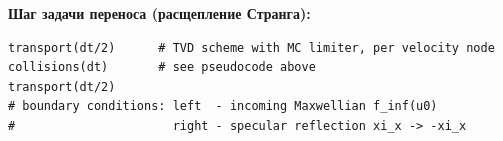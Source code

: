 \documentclass[14pt,a4paper]{extreport}
\numberwithin{equation}{chapter}
\numberwithin{figure}{chapter}
\numberwithin{table}{chapter}
\begin{document}
\medskip
\noindent\textbf{Шаг задачи переноса (расщепление Странга):}
{\footnotesize
\begin{verbatim}
transport(dt/2)      # TVD scheme with MC limiter, per velocity node
collisions(dt)       # see pseudocode above
transport(dt/2)
# boundary conditions: left  - incoming Maxwellian f_inf(u0)
#                      right - specular reflection xi_x -> -xi_x
\end{verbatim}
}
\end{document}
